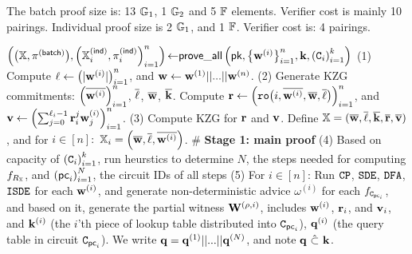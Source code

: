 The batch proof size is: 13 ${\mathbb{G}}_1$, 1 ${\mathbb{G}}_2$ and 5 $\mathbb{F}$ elements.
Verifier cost is mainly 10 pairings.
Individual proof size is 2 ${\mathbb{G}}_1$, and 1 $\mathbb{F}$. Verifier cost
is: 4 pairings.


\def\hp{\hspace*{0.1in}}
\begin{scriptsize}
\begin{algorithm*}[bt]
$ \left(\big(\mathbb{X}, \pi^{\mathsf{(batch)}}\big), \left(\mathbb{X}^{\mathsf{(ind)}}_{i},\pi^{\mathsf{(ind)}}_{i}\right)_{i=1}^{n}\right) 
	{\leftarrow} \mathsf{prove\_all}\left(\mathsf{pk}, 
		\big\{{{\mathbf {w}}}^{(i)}\big\}_{i=1}^n, {{\mathbf {k}}}, \left({\texttt{C}}_i\right)_{i=1}^k 
		\right)$ 
\newline
(1) Compute ${{\mathbf {\ell}}} \leftarrow \left(|{{\mathbf {w}}}^{(i)}|\right)_{i=1}^n$, and
	${{\mathbf {w}}} \leftarrow {{\mathbf {w}}}^{(1)} || ... || {{\mathbf {w}}}^{(n)}$. \newline
(2) Generate KZG commitments: 
	$\left(\overline{{{\mathbf {w}}}^{(i)}}\right)_{i=1}^n$, 
	$\overline{{{\mathbf {\ell}}}}$, 
	$\overline{{{\mathbf {w}}}}$, $\overline{{{\mathbf {k}}}}$.
	Compute ${{\mathbf {r}}} \leftarrow \left(\texttt{ro}\big(i, \overline{{{\mathbf {w}}}^{(i)}}, \overline{{{\mathbf {w}}}}, \overline{{{\mathbf {\ell}}}}\big)\right)_{i=1}^n$, 
	and 
	${{\mathbf {v}}} \leftarrow \left(\sum_{j=0}^{{{\mathbf {\ell}}}_{i}-1} {{\mathbf {r}}}_i^j {{\mathbf {w}}}^{(i)}_j\right)_{i=1}^n$. \newline
(3) Compute KZG for ${{\mathbf {r}}}$ and ${{\mathbf {v}}}$.
	Define $\mathbb{X} = (\overline{{{\mathbf {w}}}}, \overline{{{\mathbf {\ell}}}}, \overline{{{\mathbf {k}}}},
		\overline{{{\mathbf {r}}}}, \overline{{{\mathbf {v}}}})$,
	and for $i\in [n]:$ $\mathbb{X}_i = \left(\overline{{{\mathbf {w}}}}, \overline{{{\mathbf {\ell}}}}, \overline{{{\mathbf {w}}}^{(i)}}\right)$. \newline
\# {\bf    Stage 1: main proof} \newline
(4) Based on capacity of $\left({\texttt{C}}_i\right)_{i=1}^k$,
	run heurstics to determine $N$, the steps needed for
	computing $f_{R_{\mathbb{X}}}$, and 
	$\left(\mathsf{pc}_i\right)_{i=1}^N$, the circuit IDs of all steps 
	\newline
(5) For $i\in [n]$: Run $\texttt{CP}$, $\texttt{SDE}$, $\texttt{DFA}$, $\texttt{ISDE}$ for each ${{\mathbf {w}}}^{(i)}$,
	and generate non-deterministic advice $\omega^{(i)}$ for
	each $f_{{\texttt{C}}_{\mathsf{pc}_i}}$, and based on it,
	generate the partial witness ${{\mathbf {W}}}^{(\rho,i)}$,
	includes ${{\mathbf {w}}}^{(i)}$, ${{\mathbf {r}}}_i$, and ${{\mathbf {v}}}_i$,
	and ${{\mathbf {k}}}^{(i)}$ (the $i$'th piece of lookup table distributed
	into ${\texttt{C}}_{\mathsf{pc}_i}$), ${{\mathbf {q}}}^{(i)}$ (the query table 
	in circuit ${\texttt{C}}_{\mathsf{pc}_i}$). We write
	${{\mathbf {q}}} = {{\mathbf {q}}}^{(1)} || ... || {{\mathbf {q}}}^{(N)}$,
	and note ${{\mathbf {q}}} ~\hat{\subset}~ {{\mathbf {k}}}$.

\end{algorithm*}
\end{scriptsize}
